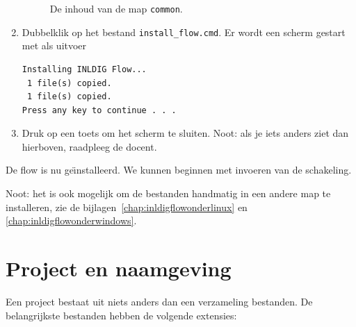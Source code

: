 \documentclass[a4paper,12pt,fleqn,twoside]{book}
\begin{document}
\begin{enumerate}
\begin{figure}[H]
\caption{De inhoud van de map \lstinline|common|.}
\label{fig:008commonmap}
\end{figure}
\item Dubbelklik op het bestand \lstinline|install_flow.cmd|. Er wordt een
      scherm gestart met als uitvoer 
\begin{lstlisting}[numbers=none,belowskip=-3.5ex]
Installing INLDIG Flow... 
 1 file(s) copied. 
 1 file(s) copied. 
Press any key to continue . . . 
\end{lstlisting}
\item Druk op een toets om het scherm te sluiten. Noot: als je iets anders
ziet dan hierboven, raadpleeg de docent. 
\end{enumerate}

De flow is nu ge\"{\i}nstalleerd. We kunnen beginnen met invoeren van
de schakeling.
 
Noot: het is ook mogelijk om de bestanden handmatig in een andere map te
installeren, zie de bijlagen~\ref{chap:inldigflowonderlinux} en
\ref{chap:inldigflowonderwindows}. 


\section{Project en naamgeving}
\label{sec:projectennaamgeving}
Een project bestaat uit niets anders dan een verzameling bestanden. De
belangrijkste bestanden hebben de volgende extensies: 
\end{document}
